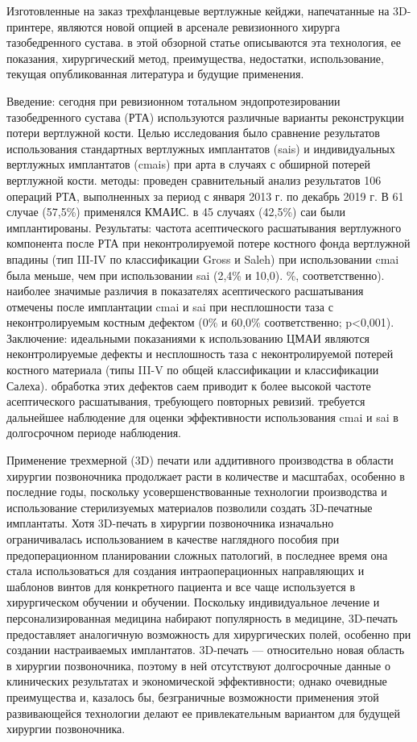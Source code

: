 Изготовленные на заказ трехфланцевые вертлужные кейджи, напечатанные на
3D-принтере, являются новой опцией в арсенале ревизионного хирурга
тазобедренного сустава. в этой обзорной статье описываются эта технология, ее
показания, хирургический метод, преимущества, недостатки, использование, текущая
опубликованная литература и будущие применения.\cite{26351112}

Введение: сегодня при ревизионном тотальном эндопротезировании тазобедренного
сустава (РТА) используются различные варианты реконструкции потери вертлужной
кости. Целью исследования было сравнение результатов использования стандартных
вертлужных имплантатов (sais) и индивидуальных вертлужных имплантатов (cmais)
при арта в случаях с обширной потерей вертлужной кости. методы: проведен
сравнительный анализ результатов 106 операций РТА, выполненных за период с
января 2013 г. по декабрь 2019 г. В 61 случае (57,5\%) применялся КМАИС. в 45
случаях (42,5\%) саи были имплантированы. Результаты: частота асептического
расшатывания вертлужного компонента после РТА при неконтролируемой потере
костного фонда вертлужной впадины (тип III-IV по классификации Gross и
Saleh) при использовании cmai была меньше, чем при использовании sai (2,4\% и
10,0). \%, соответственно). наиболее значимые различия в показателях
асептического расшатывания отмечены после имплантации cmai и sai при
несплошности таза с неконтролируемым костным дефектом (0\% и 60,0\%
соответственно; p<0,001). Заключение: идеальными показаниями к использованию
ЦМАИ являются неконтролируемые дефекты и несплошность таза с
неконтролируемой потерей костного материала (типы III-V по общей
классификации и классификации Салеха). обработка этих дефектов саем приводит
к более высокой частоте асептического расшатывания, требующего повторных
ревизий. требуется дальнейшее наблюдение для оценки эффективности
использования cmai и sai в долгосрочном периоде наблюдения.\cite{34598861}

Применение трехмерной (3D) печати или аддитивного производства в области
хирургии позвоночника продолжает расти в количестве и масштабах, особенно в
последние годы, поскольку усовершенствованные технологии производства и
использование стерилизуемых материалов позволили создать 3D-печатные имплантаты.
Хотя 3D-печать в хирургии позвоночника изначально ограничивалась использованием
в качестве наглядного пособия при предоперационном планировании сложных
патологий, в последнее время она стала использоваться для создания
интраоперационных направляющих и шаблонов винтов для конкретного пациента и все
чаще используется в хирургическом обучении и обучении. Поскольку индивидуальное
лечение и персонализированная медицина набирают популярность в медицине,
3D-печать предоставляет аналогичную возможность для хирургических полей,
особенно при создании настраиваемых имплантатов. 3D-печать — относительно новая
область в хирургии позвоночника, поэтому в ней отсутствуют долгосрочные данные о
клинических результатах и ​​экономической эффективности; однако
очевидные преимущества и, казалось бы, безграничные возможности применения этой
развивающейся технологии делают ее привлекательным вариантом для будущей
хирургии позвоночника.\cite{31624730}

